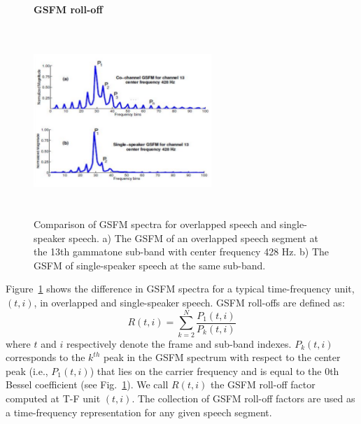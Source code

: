 {\begin{figure}[h!]
	\centering
	\hspace{-1mm}
	\textbf{GSFM roll-off}\par\medskip
	\includegraphics[height = 2.8in, width=0.6\textwidth]{figures/gsfm_rolloff}
	\vspace{-1mm}
	\caption{Comparison of GSFM spectra for overlapped speech and single-speaker speech. a) The GSFM of an overlapped speech segment at the 13th gammatone sub-band with center frequency 428 Hz. b) The GSFM of single-speaker speech at the same sub-band.}
	\vspace{0mm}
	\label{fig:gsfm_rolloff}
\end{figure}

Figure~\ref{fig:gsfm_rolloff} shows the difference in GSFM spectra for a typical time-frequency unit, $(t,i)$, in overlapped and single-speaker speech. 
GSFM roll-offs are defined as: 
\begin{equation}
\label{eq:gsfm_rolloff}
R(t,i) = \sum\limits_{k=2}^{N} \frac{P_1(t,i)}{P_k(t,i)}
\end{equation}
where $t$ and $i$ respectively denote the frame and sub-band indexes. 
$P_k(t, i)$ corresponds to the $k^{th}$ peak in the GSFM spectrum with respect to the center peak (i.e., $P_1(t,i)$) that lies on the carrier frequency and is equal to the 0th Bessel coefficient (see Fig.~\ref{fig:gsfm_rolloff}). 
We call $R(t, i)$ the GSFM roll-off factor computed at T-F unit $(t, i)$. 
The collection of GSFM roll-off factors are used as a time-frequency representation for any given speech segment. 


}

